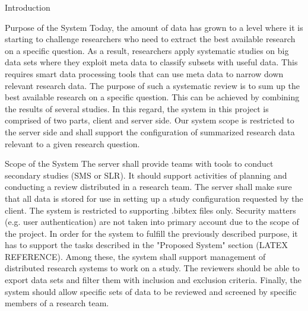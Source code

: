 \documentclass{article}
\begin{document}
\begin{section}{Introduction}

\begin{subsection}{Purpose of the System}
Today, the amount of data has grown to a level where it is starting to challenge researchers who need to extract the best available research on a specific question. As a result, researchers apply systematic studies on big data sets where they exploit meta data to classify subsets with useful data. This requires smart data processing tools that can use meta data to narrow down relevant research data. The purpose of such a systematic review is to sum up the best available research on a specific question. This can be achieved by combining the results of several studies. In this regard, the system in this project is comprised of two parts, client and server side. Our system scope is restricted to the server side and shall support the configuration of summarized research data relevant to a given research question. 
\end{subsection}

\begin{subsection}{Scope of the System}
The server shall provide teams with tools to conduct secondary studies (SMS or SLR). It should support activities of planning and conducting a review distributed in a research team. The server shall make sure that all data is stored for use in setting up a study configuration requested by the client. The system is restricted to supporting .bibtex files only. Security matters (e.g. user authentication) are not taken into primary account due to the scope of the project. 
In order for the system to fulfill the previously described purpose, it has to support the tasks described in the "Proposed System" section (LATEX REFERENCE). Among these, the system shall support management of distributed research systems to work on a study. The reviewers should be able to export data sets and filter them with inclusion and exclusion criteria. Finally, the system should allow specific sets of data to be reviewed and screened by specific members of a research team. 

\end{subsection}


\end{section}
\end{document}
